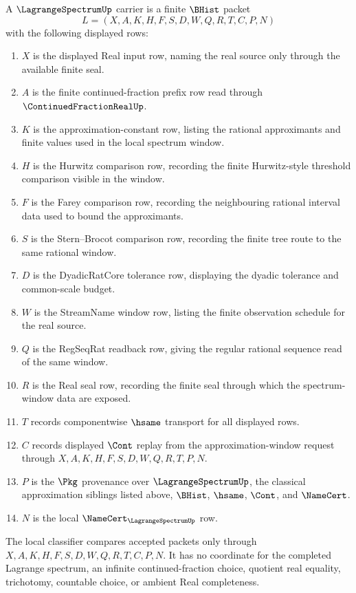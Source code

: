 \begin{definition}
\label{def:lagrange-spectrum-carrier}
A $\LagrangeSpectrumUp$ carrier is a finite $\BHist$ packet
$$
L=(X,A,K,H,F,S,D,W,Q,R,T,C,P,N)
$$
with the following displayed rows:
\begin{enumerate}
\item $X$ is the displayed Real input row, naming the real source only through the available finite seal.
\item $A$ is the finite continued-fraction prefix row read through $\ContinuedFractionRealUp$.
\item $K$ is the approximation-constant row, listing the rational approximants and finite values used in the local spectrum window.
\item $H$ is the Hurwitz comparison row, recording the finite Hurwitz-style threshold comparison visible in the window.
\item $F$ is the Farey comparison row, recording the neighbouring rational interval data used to bound the approximants.
\item $S$ is the Stern--Brocot comparison row, recording the finite tree route to the same rational window.
\item $D$ is the DyadicRatCore tolerance row, displaying the dyadic tolerance and common-scale budget.
\item $W$ is the StreamName window row, listing the finite observation schedule for the real source.
\item $Q$ is the RegSeqRat readback row, giving the regular rational sequence read of the same window.
\item $R$ is the Real seal row, recording the finite seal through which the spectrum-window data are exposed.
\item $T$ records componentwise $\hsame$ transport for all displayed rows.
\item $C$ records displayed $\Cont$ replay from the approximation-window request through $X,A,K,H,F,S,D,W,Q,R,T,P,N$.
\item $P$ is the $\Pkg$ provenance over $\LagrangeSpectrumUp$, the classical approximation siblings listed above, $\BHist$, $\hsame$, $\Cont$, and $\NameCert$.
\item $N$ is the local $\NameCert_{\LagrangeSpectrumUp}$ row.
\end{enumerate}
The local classifier compares accepted packets only through $X,A,K,H,F,S,D,W,Q,R,T,C,P,N$. It has no coordinate for the completed Lagrange spectrum, an infinite continued-fraction choice, quotient real equality, trichotomy, countable choice, or ambient Real completeness.
\end{definition}

